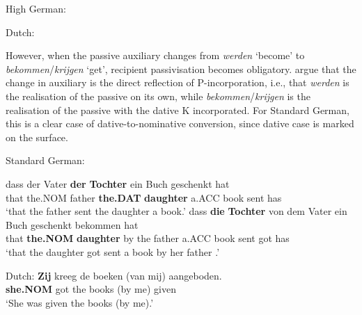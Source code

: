 \begin{exe}
\ex High German:
\begin{xlist}
\end{xlist}
\ex Dutch:
\begin{xlist}
\end{xlist}
\end{exe}


However, when the passive auxiliary changes from \textit{werden} `become' to \textit{bekommen}/\textit{krijgen} `get', recipient passivisation becomes obligatory. \cite{Alexiadou.2014} argue that the change in auxiliary is the direct reflection of P-incorporation, i.e., that \textit{werden} is the realisation of the passive on its own, while \textit{bekommen}/\textit{krijgen} is the realisation of the passive with the dative K incorporated. For Standard German, this is a clear case of dative-to-nominative conversion, since dative case is marked on the surface.

\begin{exe}
\ex Standard German:
\begin{xlist}
	\ex \gll dass der Vater \textbf{der} \textbf{Tochter} ein Buch geschenkt hat\\
	that the.NOM father \textbf{the.DAT} \textbf{daughter} a.ACC book sent has\\
	\trans `that the father sent the daughter a book.'
	\ex \gll dass \textbf{die} \textbf{Tochter} von dem Vater ein Buch geschenkt bekommen hat\\
	that \textbf{the.NOM} \textbf{daughter} by the father a.ACC book sent got has\\
	\trans `that the daughter got sent a book by her father \cite[183]{Draye.1996}.'
\end{xlist}
\ex Dutch:
\gll \textbf{Zij} kreeg de boeken (van mij) aangeboden.\\
\textbf{she.NOM} got the books (by me) given\\
\trans `She was given the books (by me).' \citep[ex. 7]{Broekhuis.1994}
\end{exe}

